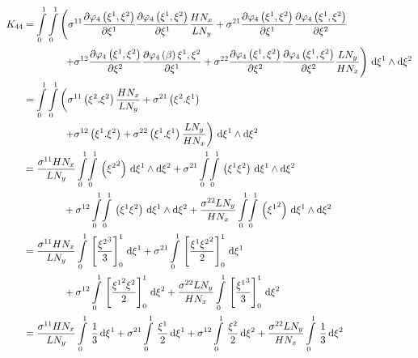 \begin{equation}
  \begin{aligned}
    K_{44}&=\dintl{0}{1}\dintl{0}{1}\left(
    \conductivitytensorsymbol^{11}\delby{\lbfn{4}{\xione,\xitwo}}{\xione}
    \delby{\lbfn{4}{\xione,\xitwo}}{\xione}\dfrac{H N_{x}}{L N_{y}}+
    \conductivitytensorsymbol^{21}\delby{\lbfn{4}{\xione,\xitwo}}{\xione}
    \delby{\lbfn{4}{\xione,\xitwo}}{\xitwo}\right.\\
    &\qquad\qquad\left.+\conductivitytensorsymbol^{12}\delby{\lbfn{4}{\xione,\xitwo}}{\xitwo}
    \delby{\lbfn{4}{\beta}{\xione,\xitwo}}{\xione}+
    \conductivitytensorsymbol^{22}\delby{\lbfn{4}{\xione,\xitwo}}{\xitwo}
    \delby{\lbfn{4}{\xione,\xitwo}}{\xitwo}\dfrac{L N_{y}}{H N_{x}}\right)\infinitesimaltwo{\xione}{\xitwo}\\
    &=\dintl{0}{1}\dintl{0}{1}\left(
    \conductivitytensorsymbol^{11}\pbrac{\xitwo.\xitwo}\dfrac{H N_{x}}{L N_{y}}+
    \conductivitytensorsymbol^{21}\pbrac{\xitwo.\xione}\right.\\
    &\qquad\qquad\left.+\conductivitytensorsymbol^{12}\pbrac{\xione.\xitwo}+
    \conductivitytensorsymbol^{22}\pbrac{\xione.\xione}\dfrac{L N_{y}}{H N_{x}}\right)
    \infinitesimaltwo{\xione}{\xitwo}\\
    &=\dfrac{\conductivitytensorsymbol^{11} H N_{x}}{L N_{y}}\giint{0}{1}{0}{1}{\pbrac{\xitwosq}}{\xione}{\xitwo}
    +\conductivitytensorsymbol^{21}\giint{0}{1}{0}{1}{\pbrac{\xione\xitwo}}{\xione}{\xitwo}\\
    &\qquad\qquad+\conductivitytensorsymbol^{12}\giint{0}{1}{0}{1}{\pbrac{\xione\xitwo}}{\xione}{\xitwo}
    +\dfrac{\conductivitytensorsymbol^{22} L N_{y}}{H N_{x}}\giint{0}{1}{0}{1}{\pbrac{\xionesq}}{\xione}{\xitwo} \\
    &=\dfrac{\conductivitytensorsymbol^{11} H N_{x}}{L N_{y}}\gint{0}{1}{\sqbrac{\dfrac{\xitwocube}{3}}^{1}_{0}}{\xione}
    +\conductivitytensorsymbol^{21}\gint{0}{1}{\sqbrac{\dfrac{\xione\xitwosq}{2}}^{1}_{0}}{\xione}\\
    &\qquad\qquad+\conductivitytensorsymbol^{12}\gint{0}{1}{\sqbrac{\dfrac{\xionesq\xitwo}{2}}^{1}_{0}}{\xitwo}
    +\dfrac{\conductivitytensorsymbol^{22} L N_{y}}{H N_{x}}\gint{0}{1}{\sqbrac{\dfrac{\xionecube}{3}}^{1}_{0}}{\xitwo} \\
    &=\dfrac{\conductivitytensorsymbol^{11} H N_{x}}{L N_{y}}\gint{0}{1}{\dfrac{1}{3}}{\xione}
    +\conductivitytensorsymbol^{21}\gint{0}{1}{\dfrac{\xione}{2}}{\xione}
    +\conductivitytensorsymbol^{12}\gint{0}{1}{\dfrac{\xitwo}{2}}{\xitwo}
    +\dfrac{\conductivitytensorsymbol^{22} L N_{y}}{H N_{x}}\gint{0}{1}{\dfrac{1}{3}}{\xitwo} \\

\end{aligned}
\end{equation}
